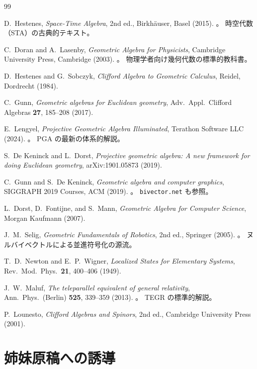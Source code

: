 \documentclass[dvipdfmx,a4paper,oneside]{jsbook}
\numberwithin{equation}{chapter}
\begin{document}
\begin{thebibliography}{99}

D.~Hestenes,
\textit{Space-Time Algebra}, 2nd ed.,
Birkh\"{a}user, Basel (2015).
。 時空代数（STA）の古典的テキスト。

C.~Doran and A.~Lasenby,
\textit{Geometric Algebra for Physicists},
Cambridge University Press, Cambridge (2003).
。 物理学者向け幾何代数の標準的教科書。

D.~Hestenes and G.~Sobczyk,
\textit{Clifford Algebra to Geometric Calculus},
Reidel, Dordrecht (1984).

C.~Gunn,
\textit{Geometric algebras for Euclidean geometry},
Adv.\ Appl.\ Clifford Algebras \textbf{27}, 185--208 (2017).

E.~Lengyel,
\textit{Projective Geometric Algebra Illuminated},
Terathon Software LLC (2024).
。 PGA の最新の体系的解説。

S.~De Keninck and L.~Dorst,
\textit{Projective geometric algebra: A new framework for doing Euclidean geometry},
arXiv:1901.05873 (2019).

C.~Gunn and S.~De Keninck,
\textit{Geometric algebra and computer graphics},
SIGGRAPH 2019 Courses, ACM (2019).
。 \texttt{bivector.net} も参照。

L.~Dorst, D.~Fontijne, and S.~Mann,
\textit{Geometric Algebra for Computer Science},
Morgan Kaufmann (2007).

J.~M.~Selig,
\textit{Geometric Fundamentals of Robotics}, 2nd ed.,
Springer (2005).
。 ヌルバイベクトルによる並進符号化の源流。

T.~D.~Newton and E.~P.~Wigner,
\textit{Localized States for Elementary Systems},
Rev.\ Mod.\ Phys.\ \textbf{21}, 400--406 (1949).

J.~W.~Maluf,
\textit{The teleparallel equivalent of general relativity},
Ann.\ Phys.\ (Berlin) \textbf{525}, 339--359 (2013).
。 TEGR の標準的解説。

P.~Lounesto,
\textit{Clifford Algebras and Spinors}, 2nd ed.,
Cambridge University Press (2001).

\end{thebibliography}

\section{姉妹原稿への誘導}
\label{sec:sister-manuscripts}
\end{document}
